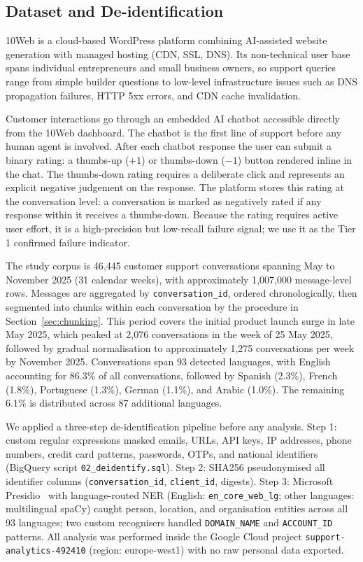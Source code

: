 \documentclass[conference]{IEEEtran}
\begin{document}
\subsection{Dataset and De-identification}

10Web is a cloud-based WordPress platform combining AI-assisted website generation with managed hosting (CDN, SSL, DNS). Its non-technical user base spans individual entrepreneurs and small business owners, so support queries range from simple builder questions to low-level infrastructure issues such as DNS propagation failures, HTTP 5xx errors, and CDN cache invalidation.

Customer interactions go through an embedded AI chatbot accessible directly from the 10Web dashboard. The chatbot is the first line of support before any human agent is involved. After each chatbot response the user can submit a binary rating: a thumbs-up ($+1$) or thumbs-down ($-1$) button rendered inline in the chat. The thumbs-down rating requires a deliberate click and represents an explicit negative judgement on the response. The platform stores this rating at the conversation level: a conversation is marked as negatively rated if any response within it receives a thumbs-down. Because the rating requires active user effort, it is a high-precision but low-recall failure signal; we use it as the Tier 1 confirmed failure indicator.

The study corpus is 46{,}445 customer support conversations spanning May to November 2025 (31 calendar weeks), with approximately 1{,}007{,}000 message-level rows. Messages are aggregated by \texttt{conversation\_id}, ordered chronologically, then segmented into chunks within each conversation by the procedure in Section~\ref{sec:chunking}. This period covers the initial product launch surge in late May 2025, which peaked at 2{,}076 conversations in the week of 25 May 2025, followed by gradual normalisation to approximately 1{,}275 conversations per week by November 2025. Conversations span 93 detected languages, with English accounting for 86.3\% of all conversations, followed by Spanish (2.3\%), French (1.8\%), Portuguese (1.3\%), German (1.1\%), and Arabic (1.0\%). The remaining 6.1\% is distributed across 87 additional languages.

We applied a three-step de-identification pipeline before any analysis. Step 1: custom regular expressions masked emails, URLs, API keys, IP addresses, phone numbers, credit card patterns, passwords, OTPs, and national identifiers (BigQuery script \texttt{02\_deidentify.sql}). Step 2: SHA256 pseudonymised all identifier columns (\texttt{conversation\_id}, \texttt{client\_id}, digests). Step 3: Microsoft Presidio~\cite{mendez2019presidio} with language-routed NER (English: \texttt{en\_core\_web\_lg}; other languages: multilingual spaCy) caught person, location, and organisation entities across all 93 languages; two custom recognisers handled \texttt{DOMAIN\_NAME} and \texttt{ACCOUNT\_ID} patterns. All analysis was performed inside the Google Cloud project \texttt{support-analytics-492410} (region: europe-west1) with no raw personal data exported.
\end{document}
